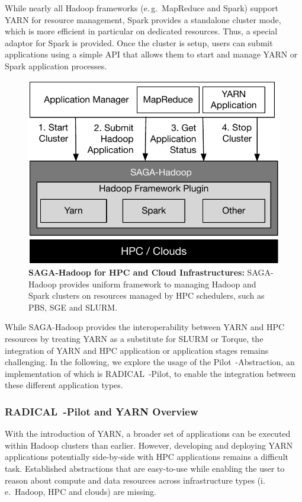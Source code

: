 While nearly all Hadoop frameworks (e.\,g.\ MapReduce and Spark) support YARN for resource management, Spark provides a standalone cluster mode, which is more efficient in particular on dedicated resources.
Thus, a special adaptor for Spark is provided.
Once the cluster is setup, users can submit applications using a simple API that allows them to start and manage YARN or Spark application processes.

\begin{figure}[t]
    \centering
    \includegraphics[width=.95\textwidth]{figures/data_analytics_hpc/hpc_hadoop/pilot-abds.pdf}
    \caption{\textbf{SAGA-Hadoop for HPC and Cloud Infrastructures:} 
        SAGA-Hadoop provides  uniform framework to managing Hadoop and Spark clusters on resources managed by HPC schedulers, such as PBS, SGE and SLURM.}
    \label{fig:saga-hadoop}
\end{figure}

While SAGA-Hadoop provides the interoperability between YARN and HPC resources by treating YARN as a substitute for SLURM or Torque, the integration of YARN and HPC application or application stages remains challenging.
In the following, we explore the usage of the Pilot~-Abstraction, an implementation of which is RADICAL~-Pilot, to enable the integration between these different application types.

\subsubsection{RADICAL~-Pilot and YARN Overview}
\label{sec:pilot_hadoop_hpc}
\label{sec:rp-impl}


With the introduction of YARN, a broader set of applications can be executed within Hadoop clusters than earlier.
However, developing and deploying YARN applications potentially side-by-side with HPC applications remains a difficult task.
Established abstractions that are easy-to-use while enabling the user to reason about compute and data resources across infrastructure types (i.\,e.\ Hadoop, HPC and clouds) are missing. 

